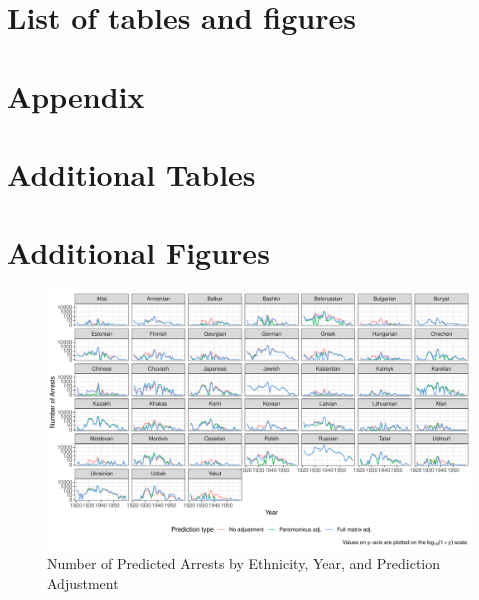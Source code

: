 \newpage
\section*{List of tables and figures}
\listoftables
\listoffigures



\newpage
\section*{Appendix}

\section*{Additional Tables}
{

\newpage


\newpage


\newpage

\thispagestyle{empty}

\newpage


\newpage


\newpage
}
\section*{Additional Figures}
\begin{figure}[!h]
\centering
\includegraphics[width=1.2\textwidth]{plots/arrests/prediction_type_by_year.pdf}
\caption{Number of Predicted Arrests by Ethnicity, Year, and Prediction Adjustment}
\label{fig:facet_by_year}
\end{figure}

